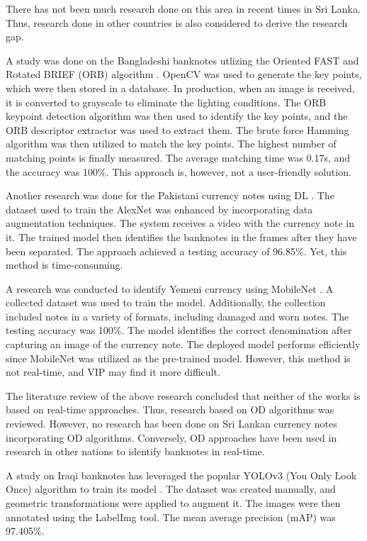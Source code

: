There has not been much research done on this area in recent times in Sri Lanka. Thus, research done in other countries is also considered to derive the research gap.

A study was done on the Bangladeshi banknotes utlizing the Oriented FAST and Rotated BRIEF (ORB) algorithm \cite{b8}. OpenCV was used to generate the key points, which were then stored in a database. In production, when an image is received, it is converted to grayscale to eliminate the lighting conditions. The ORB keypoint detection algorithm was then used to identify the key points, and the ORB descriptor extractor was used to extract them. The brute force Hamming algorithm was then utilized to match the key points. The highest number of matching points is finally measured. The average matching time was 0.17s, and the accuracy was 100\%. This approach is, however, not a user-friendly solution.

Another research was done for the Pakistani currency notes using DL \cite{b9}. The dataset used to train the AlexNet was enhanced by incorporating data augmentation techniques. The system receives a video with the currency note in it. The trained model then identifies the banknotes in the frames after they have been separated. The approach achieved a testing accuracy of 96.85\%. Yet, this method is time-consuming.

A research was conducted to identify Yemeni currency using MobileNet \cite{b10}. A collected dataset was used to train the model. Additionally, the collection included notes in a variety of formats, including damaged and worn notes. The testing accuracy was 100\%. The model identifies the correct denomination after capturing an image of the currency note. The deployed model performs efficiently since MobileNet was utilized as the pre-trained model. However, this method is not real-time, and VIP may find it more difficult.

The literature review of the above research concluded that neither of the works is based on real-time approaches. Thus, research based on OD algorithms was reviewed. However, no research has been done on Sri Lankan currency notes incorporating OD algorithms. Conversely, OD approaches have been used in research in other nations to identify banknotes in real-time.

A study on Iraqi banknotes has leveraged the popular YOLOv3 (You Only Look Once) algorithm to train its model \cite{b11}. The dataset was created manually, and geometric transformations were applied to augment it. The images were then annotated using the LabelImg tool. The mean average precision (mAP) was 97.405\%.


